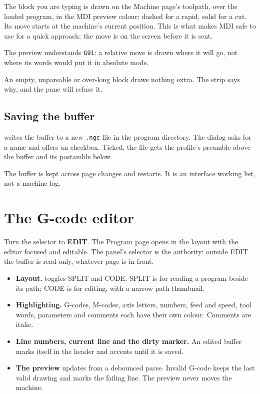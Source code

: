 The block you are typing is drawn on the Machine page's toolpath, over the loaded program, in
the MDI preview colour: dashed for a rapid, solid for a cut. Its move starts at the machine's
current position. This is what makes MDI safe to use for a quick approach: the move is on the
screen before it is sent.

The preview understands \texttt{G91}: a relative move is drawn where it will go, not where
its words would put it in absolute mode.

\begin{notebox}
  An empty, unparsable or over-long block draws nothing extra. The strip says why, and the
  pane will refuse it.
\end{notebox}

\subsection*{Saving the buffer}

 writes the buffer to a new \texttt{.ngc} file in the program
directory. The dialog asks for a name and offers an  checkbox. Ticked,
the file gets the profile's preamble above the buffer and its postamble below.

The buffer is kept across page changes and restarts. It is an interface working list, not a
machine log.

\section{The G-code editor}

Turn the selector to \textbf{EDIT}. The Program page opens in the  layout with the
editor focused and editable. The panel's selector is the authority: outside EDIT the buffer
is read-only, whatever page is in front.

\begin{itemize}
  \item \textbf{Layout.}  toggles SPLIT and CODE. SPLIT is for reading a program
        beside its path; CODE is for editing, with a narrow path thumbnail.
  \item \textbf{Highlighting.} G-codes, M-codes, axis letters, numbers, feed and speed, tool
        words, parameters and comments each have their own colour. Comments are italic.
  \item \textbf{Line numbers, current line and the dirty marker.} An edited buffer marks
        itself in the header and accents  until it is saved.
  \item \textbf{The preview} updates from a debounced parse. Invalid G-code keeps the last
        valid drawing and marks the failing line. The preview never moves the machine.
\end{itemize}

